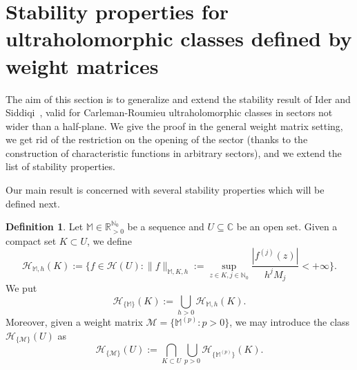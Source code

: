 \documentclass[11pt,a4paper]{article}
\theoremstyle{plain}
\theoremstyle{definition}
\newtheorem{definition}[proposition]{Definition}
\newcommand{\RR}{\mathbb{R}}
\newcommand{\CC}{\mathbb{C}}
\newcommand{\NN}{\mathbb{N}}
\newcommand{\red}[1]{{\color{red}#1}}
\newcommand{\M}{\mathbb{M}}
\newcommand{\G}{\mathbb{G}}
\begin{document}

\section{Stability properties for ultraholomorphic classes defined by weight matrices}\label{sect.StabilityPropert}

The aim of this section is to generalize and extend the stability result of Ider and Siddiqi~\cite[Thm. 1]{IderSiddiqi}, valid for Carleman-Roumieu ultraholomorphic classes in sectors not wider than a half-plane. We give the proof in the general weight matrix setting, we get rid of the restriction on the opening of the sector (thanks to the construction of characteristic functions in arbitrary sectors), and we extend the list of stability properties.


Our main result is concerned with several stability properties which will be defined next.

\begin{definition} Let $\M\in\RR_{>0}^{\NN_0}$ be a sequence and $U\subseteq\CC$ be an open set. Given a compact set $K\subset U$, we define
	$$\mathcal{H}_{\M,h}(K):=\{f\in \mathcal{H}(U): \|f\|_{\M,K,h}:=\sup_{z\in K, j\in\NN_0}\frac{|f^{(j)}(z)|}{h^j M_j}<+\infty\}.$$
We put
	\begin{equation*}
		 \mathcal{H}_{\{\M\}}(K):=\bigcup_{h>0}\mathcal{H}_{\M,h}(K).
	\end{equation*}
Moreover, given a weight matrix $\mathcal{M}=\{\M^{(p)}: p>0\}$, we may introduce the class $\mathcal{H}_{\{\mathcal{M}\}}(U)$ as
	\begin{equation*}%
		\mathcal{H}_{\{\mathcal{M}\}}(U):=\bigcap_{K\subset U}\bigcup_{p>0}\mathcal{H}_{\{\M^{(p)}\}}(K).
	\end{equation*}	
\end{definition}
\end{document}
